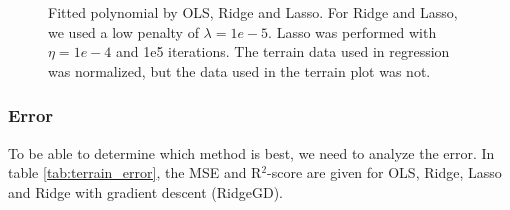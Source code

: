\begin{figure} [H]
	
	\caption{Fitted polynomial by OLS, Ridge and Lasso. For Ridge and Lasso, we used a low penalty of $\lambda=1e-5$. Lasso was performed with $\eta=1e-4$ and 1e5 iterations. The terrain data used in regression was normalized, but the data used in the terrain plot was not.}%
	\label{fig:terrain_plots}%
\end{figure}
\restoregeometry


\subsubsection{Error}
To be able to determine which method is best, we need to analyze the error. In table \eqref{tab:terrain_error}, the MSE and R$^2$-score are given for OLS, Ridge, Lasso and Ridge with gradient descent (RidgeGD). 

